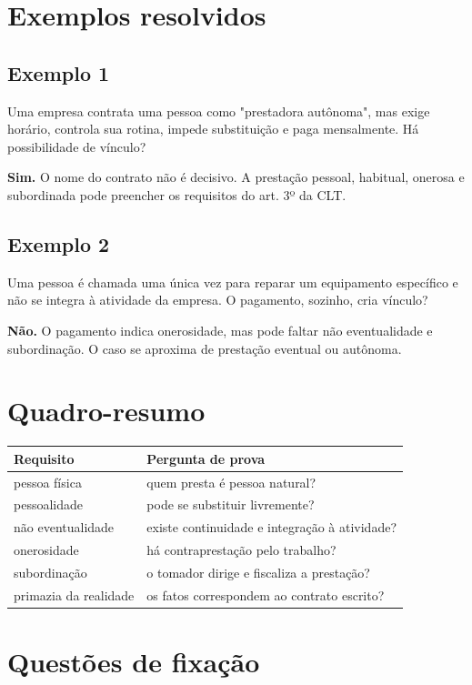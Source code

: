 \documentclass[11pt,a4paper]{article}
\begin{document}
\section*{Exemplos resolvidos}

\subsection*{Exemplo 1}

Uma empresa contrata uma pessoa como "prestadora autônoma", mas exige horário, controla sua rotina, impede substituição e paga mensalmente. Há possibilidade de vínculo?

\textbf{Sim.} O nome do contrato não é decisivo. A prestação pessoal, habitual, onerosa e subordinada pode preencher os requisitos do art. 3º da CLT.

\subsection*{Exemplo 2}

Uma pessoa é chamada uma única vez para reparar um equipamento específico e não se integra à atividade da empresa. O pagamento, sozinho, cria vínculo?

\textbf{Não.} O pagamento indica onerosidade, mas pode faltar não eventualidade e subordinação. O caso se aproxima de prestação eventual ou autônoma.

\section*{Quadro-resumo}

\begin{tabularx}{\linewidth}{lX}
\toprule
 \textbf{Requisito} & \textbf{Pergunta de prova} \\
\midrule
 pessoa física & quem presta é pessoa natural? \\
 pessoalidade & pode se substituir livremente? \\
 não eventualidade & existe continuidade e integração à atividade? \\
 onerosidade & há contraprestação pelo trabalho? \\
 subordinação & o tomador dirige e fiscaliza a prestação? \\
 primazia da realidade & os fatos correspondem ao contrato escrito? \\
\bottomrule
\end{tabularx}


\section*{Questões de fixação}
\end{document}
